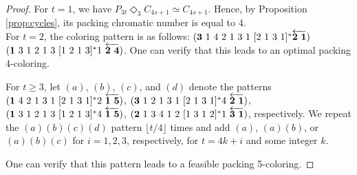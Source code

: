 \documentclass{article}
\begin{document}
\begin{proof}
For $t=1$, we have $P_{3t}\Diamond_3 C_{4s+1} \simeq C_{4s+1}$. Hence, by Proposition \ref{prop:cycles}, its packing chromatic number is equal to 4. 
\\For $t=2$, the coloring pattern is as follows: $({\textbf 3}\ 1\ 4\ 2\ 1\ 3\ 1\ [2\ 1\ 3\ 1]^*\overleftarrow{{\bf 2\ 1}})$ $({\textbf 1}\ 3\ 1\ 2\ 1\ 3\ [1\ 2\ 1\ 3]^*1\ \overleftarrow{{\bf 2\ 4}})$.
One can verify that this leads to an optimal packing 4-coloring.  

\noindent For $t \geq 3$, let $(a)$, $(b)$, $(c)$, and $(d)$ denote the patterns $({\bf 1}\ 4\ 2\ 1\ 3\ 1\ [2\ 1\ 3\ 1]^*2\ \overleftarrow{{\bf 1\ 5}})$, $({\bf 3}\ 1\ 2\ 1\ 3\ 1\ [2\ 1\ 3\ 1]^*4\ \overleftarrow{{\bf 2\ 1}})$, $({\bf 1}\ 3\ 1\ 2\ 1\ 3\ [1\ 2\ 1\ 3]^*4\ \overleftarrow{{\bf 1\ 5}})$, $({\bf 2}\ 1\ 3\ 4\ 1\ 2\ [1\ 3\ 1\ 2]^*1\ \overleftarrow{{\bf 3\ 1}})$, respectively. We repeat the $(a)(b)(c)(d)$ pattern $\lfloor t/4 \rfloor$ times and add $(a)$, $(a)(b)$, or $(a)(b)(c)$ for $i = 1, 2, 3$, respectively, for $t = 4k + i$ and some integer $k$.

\noindent One can verify that this pattern leads to a feasible packing 5-coloring.

\end{proof}
\end{document}

